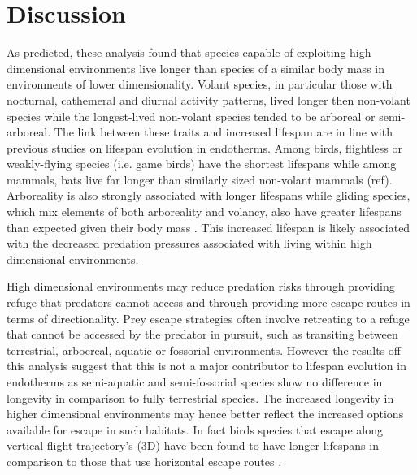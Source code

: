 \section{Discussion}

As predicted, these analysis found that species capable of exploiting high dimensional environments live longer than species of a similar body mass in environments of lower dimensionality. Volant species, in particular those with nocturnal, cathemeral and diurnal activity patterns, lived longer then non-volant species while the longest-lived non-volant species tended to be arboreal or semi-arboreal. The link between these traits and increased lifespan are in line with previous studies on lifespan evolution in endotherms. Among birds, flightless or weakly-flying species (i.e. game birds) have the shortest lifespans \citep{ricklefs2010life,Williams1957,wilkinson2002life} while among mammals, bats live far longer than similarly sized non-volant mammals (ref). Arboreality is also strongly associated with longer lifespans \citep{shattuck2010arboreality} while gliding species, which mix elements of both arboreality and volancy, also have greater lifespans than expected given their body mass \citep{holmes1994fly}. This increased lifespan is likely associated with the decreased predation pressures associated with living within high dimensional environments.


High dimensional environments may reduce predation risks through providing refuge that predators cannot access and through providing more escape routes in terms of directionality. Prey escape strategies often involve retreating to a refuge that cannot be accessed by the predator in pursuit, such as transiting between terrestrial, arboereal, aquatic or fossorial environments. However the results off this analysis suggest that this is not a major contributor to lifespan evolution in endotherms as semi-aquatic and semi-fossorial species show no difference in longevity in comparison to fully terrestrial species. The increased longevity in higher dimensional environments may hence better reflect the increased options available for escape in such habitats. In fact birds species that escape along vertical flight trajectory's (3D) have been found to have longer lifespans in comparison to those that use horizontal escape routes \citep{moller2010up}. 


